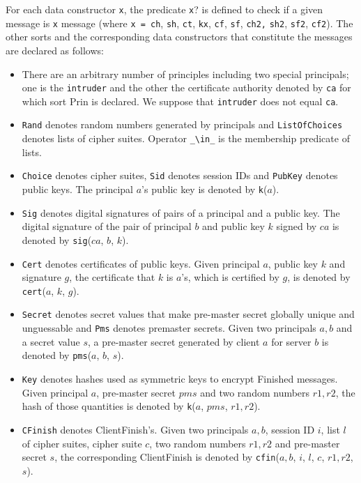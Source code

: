\documentclass[a4paper,fleqn]{cas-dc}
\begin{document}
For each data constructor \verb!x!, the predicate \verb!x!? is defined to check if a given message is \verb!x! message (where \verb!x = ch!, \verb!sh!, \verb!ct!, \verb!kx!, \verb!cf!, \verb!sf!, \verb!ch2,! \verb!sh2!, \verb!sf2!, \verb!cf2!).
The other sorts and the corresponding data
constructors that constitute the messages are declared as follows:
\begin{itemize}
  \item There are an arbitrary number of principles including two special principals; one is the \verb!intruder! and the other the certificate authority denoted by \verb!ca! for which sort Prin is declared. We suppose that \verb!intruder! does not equal \verb!ca!. 
  \item \verb!Rand! denotes random numbers generated by principals and
\verb!ListOfChoices! denotes lists of cipher suites. Operator \verb|_\in_| is the membership predicate of lists.
  \item \verb!Choice! denotes cipher suites, \verb!Sid! denotes session IDs and \verb!PubKey! denotes public keys. The principal $a$’s public key is denoted by \verb!k!($a$).
\item \verb!Sig! denotes digital signatures of pairs of a principal and a public key. The digital signature of the pair of principal $b$ and public key $k$ signed by $ca$ is denoted by \verb!sig!($ca$, $b$, $k$).
\item \verb!Cert! denotes certificates of public keys. Given principal $a$, public key $k$ and signature $g$, the certificate that $k$ is $a$’s, which is certified by $g$, is denoted by \verb!cert!($a$, $k$, $g$).
\item \verb!Secret! denotes secret values that make pre-master secret globally unique and unguessable and \verb!Pms! denotes premaster secrets. Given two principals $a,b$ and a secret value $s$, a pre-master secret generated by client $a$ for server $b$ is denoted by \verb!pms!($a$, $b$, $s$).
\item \verb!Key! denotes hashes used as symmetric keys to encrypt Finished messages. Given principal $a$, pre-master secret $pms$ and two random numbers $r1,r2$, the hash of those quantities is denoted by \verb!k!($a$, $pms$, $r1, r2$).
\item \verb!CFinish! denotes ClientFinish’s. Given two principals $a, b$, session ID $i$, list $l$ of cipher suites, cipher suite $c$, two random numbers $r1, r2$ and pre-master secret $s$, the corresponding ClientFinish is denoted by \verb!cfin!($a, b$, $i$, $l$, $c$, $r1, r2$, $s$).

\end{itemize}
\end{document}
